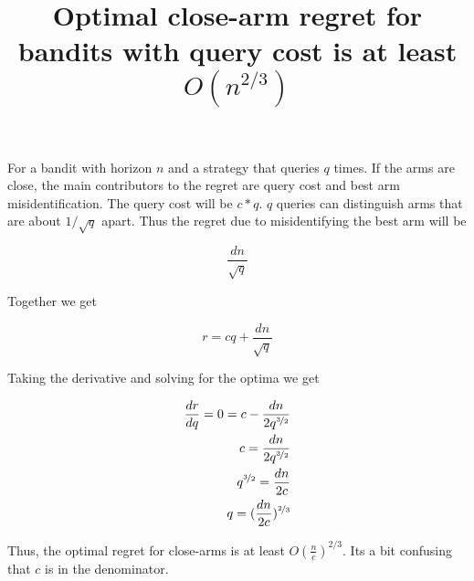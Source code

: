 \documentclass{article}
\begin{document}
\title{Optimal close-arm regret for bandits with query cost is at least $O(n^{2/3})$ }
\maketitle

For a bandit with horizon $n$ and a strategy that queries $q$ times. If the arms are close, the main contributors to the regret are query cost and best arm misidentification. The query cost will be $c*q$. $q$ queries can distinguish arms that are about $1/\sqrt{q}$ apart. Thus the regret due to misidentifying the best arm will be

$$
\frac{ d n}{\sqrt{q}}
$$

Together we get 

$$
r = cq + \frac{ d n}{\sqrt{q}}
$$

Taking the derivative and solving for the optima we get 

\begin{align}
\frac{dr}{dq} = 0 = c - \frac{d n}{2 q^{\nicefrac{3}{2}} } 
\\c = \frac{d n}{2 q^{\nicefrac{3}{2}}} 
\\q^{\nicefrac{3}{2}} = \frac{d n}{2 c} 
\\ q = (\frac{d n}{2 c})^{\nicefrac{2}{3} }
\end{align}

Thus, the optimal regret for close-arms is at least $O(\frac{n}{c})^{2/3}$. Its a bit confusing that $c$ is in the denominator.
\end{document}
